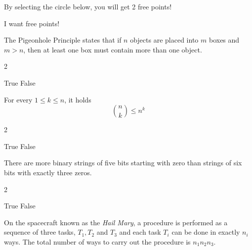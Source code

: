 \documentclass[11pt,addpoints]{exam}
\begin{document}
\begin{questions} %

\question[2] By selecting the circle below, you will get 2 free points!
    \begin{choices}
        \choice I want free points!
    \end{choices}

    



\question[3] The Pigeonhole Principle states that if $n$ objects are placed into $m$ boxes and $m>n$, then at least one box must contain more than one object.

\begin{multicols}{2}
    \begin{choices}
        \choice True 
        \choice False %
    \end{choices}
\end{multicols}



\question[3] For every $1\leq k\leq n$, it holds
\[
{n\choose k}\leq n^k
\]

\begin{multicols}{2}
    \begin{choices}
        \choice True %
        \choice False 
    \end{choices}
\end{multicols}


\question[3] There are more binary strings of five bits starting with zero than strings of six bits with exactly three zeros.

\begin{multicols}{2}
    \begin{choices}
        \choice True 
        \choice False %
    \end{choices}
\end{multicols}
\question[3] On the spacecraft known as the \textit{Hail Mary}, a procedure is performed as a sequence of three tasks, $T_1, T_2$ and $T_3$ and each task $T_i$ can be done in exactly $n_i$ ways. The total number of ways to carry out the procedure is $n_1n_2n_3$. 


\end{questions}
\end{document}
